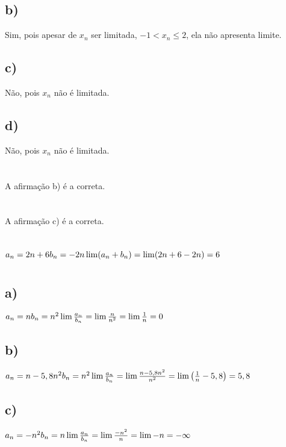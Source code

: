 \documentclass{article}
\begin{document}
\subsection*{b)} Sim, pois apesar de $x_n$ ser limitada, $-1 < x_n \leq 2$, ela não apresenta limite.
\subsection*{c)} Não, pois $x_n$ não é limitada.
\subsection*{d)} Não, pois $x_n$ não é limitada.

\section{}
A afirmação b) é a correta.

\section{}
A afirmação c) é a correta.

\section{}
$a_n = 2n + 6\\
b_n = -2n\\
\lim (a_n + b_n) = \lim (2n + 6 - 2n) = 6$

\section{}
\subsection*{a)}
$a_n = n\\
b_n = n^2\\
\lim \frac{a_n}{b_n} = \lim \frac{n}{n^2} = \lim \frac{1}{n} = 0$

\subsection*{b)}
$a_n = n - 5,8n^2\\
b_n = n^2\\
\lim \frac{a_n}{b_n} = \lim \frac{n-5,8n^2}{n^2} = \lim \left(\frac{1}{n} - 5,8\right) = 5,8$

\subsection*{c)}
$a_n = -n^2\\
b_n = n\\
\lim \frac{a_n}{b_n} = \lim \frac{-n^2}{n} = \lim -n = -\infty$
\end{document}
